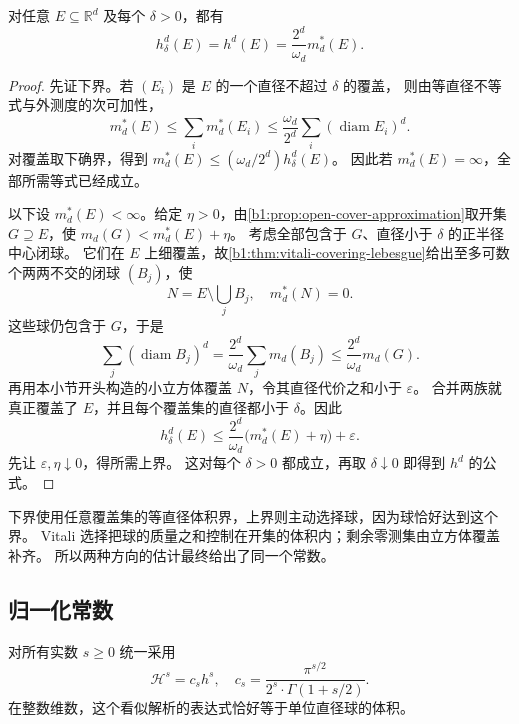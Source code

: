 \begin{proposition}\label{b1:prop:raw-hausdorff-lebesgue}
对任意 \(E\subseteq\mathbb R^d\) 及每个 \(\delta>0\)，都有
\[
 h_\delta^d(E)=h^d(E)=\frac{2^d}{\omega_d}m_d^*(E).
\]
\end{proposition}
\begin{proof}
先证下界。若 \((E_i)\) 是 \(E\) 的一个直径不超过 \(\delta\) 的覆盖，
则由等直径不等式与外测度的次可加性，
\[
 m_d^*(E)\leq\sum_i m_d^*(E_i)
 \leq\frac{\omega_d}{2^d}\sum_i(\operatorname{diam}E_i)^d.
\]
对覆盖取下确界，得到 \(m_d^*(E)\leq(\omega_d/2^d)h_\delta^d(E)\)。
因此若 \(m_d^*(E)=\infty\)，全部所需等式已经成立。

以下设 \(m_d^*(E)<\infty\)。给定 \(\eta>0\)，由\cref{b1:prop:open-cover-approximation}取开集 \(G\supseteq E\)，使
\(m_d(G)<m_d^*(E)+\eta\)。
考虑全部包含于 \(G\)、直径小于 \(\delta\) 的正半径中心闭球。
它们在 \(E\) 上细覆盖，故\cref{b1:thm:vitali-covering-lebesgue}给出至多可数个两两不交的闭球 \((B_j)\)，使
\[
 N=E\setminus\bigcup_jB_j,
 \quad m_d^*(N)=0.
\]
这些球仍包含于 \(G\)，于是
\[
 \sum_j(\operatorname{diam}B_j)^d
 =\frac{2^d}{\omega_d}\sum_j m_d(B_j)
 \leq\frac{2^d}{\omega_d}m_d(G).
\]
再用本小节开头构造的小立方体覆盖 \(N\)，令其直径代价之和小于 \(\varepsilon\)。
合并两族就真正覆盖了 \(E\)，并且每个覆盖集的直径都小于 \(\delta\)。因此
\[
 h_\delta^d(E)
 \leq\frac{2^d}{\omega_d}\bigl(m_d^*(E)+\eta\bigr)+\varepsilon.
\]
先让 \(\varepsilon,\eta\downarrow0\)，得所需上界。
这对每个 \(\delta>0\) 都成立，再取 \(\delta\downarrow0\) 即得到 \(h^d\) 的公式。
\end{proof}

下界使用任意覆盖集的等直径体积界，上界则主动选择球，因为球恰好达到这个界。
Vitali 选择把球的质量之和控制在开集的体积内；剩余零测集由立方体覆盖补齐。
所以两种方向的估计最终给出了同一个常数。

\subsection{归一化常数}
\label{b1:subsec:150304}

对所有实数 \(s\geq0\) 统一采用
\[
 \mathcal H^s=c_sh^s,\quad
 c_s=\frac{\pi^{s/2}}{2^s\cdot \Gamma(1+s/2)}.
\]
在整数维数，这个看似解析的表达式恰好等于单位直径球的体积。

